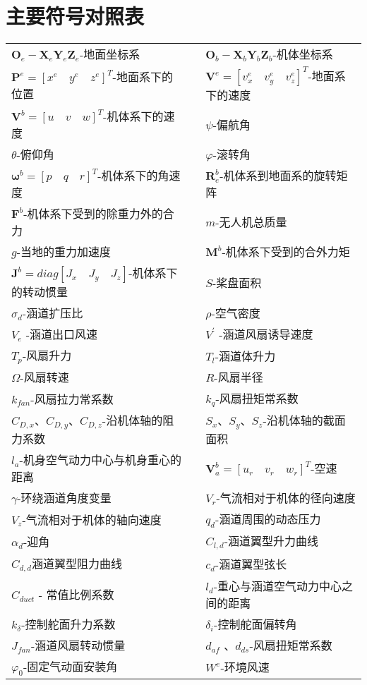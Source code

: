 \chapter{主要符号对照表}

\begin{table}
	\centering{}%
	\begin{tabular}{l>{\centering}p{0.5cm}l}
	 $ \boldsymbol{O}_e-\boldsymbol{X}_e\boldsymbol{Y}_e\boldsymbol{Z}_e $-地面坐标系  &  & ${\boldsymbol{O}_b}-{\boldsymbol{X}_b}{\boldsymbol{Y}_b}{\boldsymbol{Z}_b}$-机体坐标系\tabularnewline
     $\boldsymbol{P}^{e}=[{x}^{e} \quad {y}^{e} \quad {z}^{e}]^{T}$-地面系下的位置 &  & $\boldsymbol{V}^{e}=[{v}^{e}_{x} \quad {v}^{e}_{y} \quad {v}^{e}_{z}]^{T}$-地面系下的速度\tabularnewline
     $\boldsymbol{V}^{b}=[{u} \quad {v} \quad {w}]^{T}$-机体系下的速度 && $ \psi $-偏航角\tabularnewline
	 $\theta$-俯仰角                                                    && $\varphi$-滚转角\tabularnewline
     $\boldsymbol{\omega}^b=[p \quad q \quad r]^T$-机体系下的角速度 && $\boldsymbol{R}_e^b$-机体系到地面系的旋转矩阵\tabularnewline
	 $\boldsymbol{F}^b$-机体系下受到的除重力外的合力  							  &  &   $m $-无人机总质量\tabularnewline
	 $ g $-当地的重力加速度								&  &  $\boldsymbol{M}^b$-机体系下受到的合外力矩\tabularnewline
	 $\boldsymbol{J}^b=diag[J_x \quad J_y \quad J_z]$-机体系下的转动惯量 		    &  &   $S$-桨盘面积\tabularnewline
	 $ \sigma_d $-涵道扩压比 	&  &  $\rho$-空气密度\tabularnewline
	  $V_e$	-涵道出口风速							  &  &  $V^{\prime}$	-涵道风扇诱导速度\tabularnewline
      $T_{p}$-风扇升力  						 &  &  $T_l$-涵道体升力\tabularnewline
	 $\Omega$-风扇转速 							 &  &  $R$-风扇半径\tabularnewline
	 $k_{fan}$-风扇拉力常系数 							 &  &  $k_{q}$-风扇扭矩常系数\tabularnewline
     $C_{D,x}$、$C_{D,y}$、$C_{D,z}$-沿机体轴的阻力系数  &  &  $S_x $、$ S_y $、$ S_z $-沿机体轴的截面面积\tabularnewline
	 $l_{a}$-机身空气动力中心与机身重心的距离   			  &  &  $\boldsymbol{V}_a^b= [ u_r \quad v_r \quad w_r ]^T$-空速\tabularnewline
     $\gamma$-环绕涵道角度变量 						  &  &  ${{V}_r}$-气流相对于机体的径向速度\tabularnewline 
    ${{V}_z}$-气流相对于机体的轴向速度   &  &  ${{q}_d}$-涵道周围的动态压力\tabularnewline
     $ \alpha_d $-迎角 							 &  &  $C_{l, d}$-涵道翼型升力曲线\tabularnewline
	 $C_{d, d}$涵道翼型阻力曲线  		      &  &  $c_d$-涵道翼型弦长\tabularnewline 
     $C_{d u c t}$ - 常值比例系数  					&  &  $l_{d}$-重心与涵道空气动力中心之间的距离\tabularnewline
	 $k_{\delta}$-控制舵面升力系数 				 &  &  $\delta_i$-控制舵面偏转角\tabularnewline
	 $ J_{fan}$-涵道风扇转动惯量  						   &  &  $ d_{af} $ 、$ d_{ds} $-风扇扭矩常系数\tabularnewline
	 ${\varphi}_{0}$-固定气动面安装角  						&  & $W^e$-环境风速\tabularnewline 					
	\end{tabular}
\end{table}